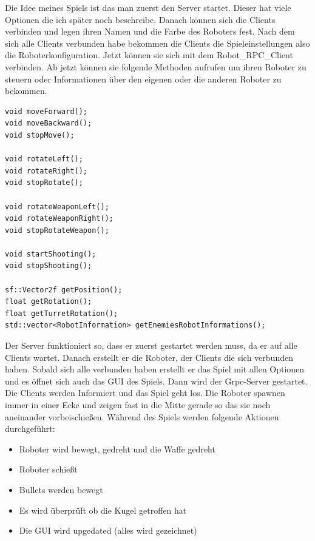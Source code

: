 \documentclass{article}
\begin{document}
Die Idee meines Spiels ist das man zuerst den Server startet. Dieser hat viele Optionen die ich später noch beschreibe. Danach können sich die Clients verbinden und legen ihren Namen und die Farbe des Roboters fest. Nach dem sich alle Clients verbunden habe bekommen die Clients die Spieleinstellungen also die Roboterkonfiguration. Jetzt können sie sich mit dem Robot\_RPC\_Client verbinden. Ab jetzt können sie folgende Methoden aufrufen um ihren Roboter zu steuern oder Informationen über den eigenen oder die anderen Roboter zu bekommen.

\begin{verbatim}
void moveForward();
void moveBackward();
void stopMove();

void rotateLeft();
void rotateRight();
void stopRotate();

void rotateWeaponLeft();
void rotateWeaponRight();
void stopRotateWeapon();

void startShooting();
void stopShooting();

sf::Vector2f getPosition();
float getRotation();
float getTurretRotation();
std::vector<RobotInformation> getEnemiesRobotInformations();
\end{verbatim}

Der Server funktioniert so, dass er zuerst gestartet werden muss, da er auf alle Clients wartet. Danach erstellt er die Roboter, der Clients die sich verbunden haben. Sobald sich alle verbunden haben erstellt er das Spiel mit allen Optionen und es öffnet sich auch das GUI des Spiels. Dann wird der Grpc-Server gestartet. Die Clients werden Informiert und das Spiel geht los. Die Roboter spawnen immer in einer Ecke und zeigen fast in die Mitte gerade so das sie noch aneinander vorbeischießen. Während des Spiels werden folgende Aktionen durchgeführt:

\begin{itemize}
\item Roboter wird bewegt, gedreht und die Waffe gedreht
\item Roboter schießt
\item Bullets werden bewegt
\item Es wird überprüft ob die Kugel getroffen hat
\item Die GUI wird upgedated (alles wird gezeichnet)
\end{itemize}
\end{document}
